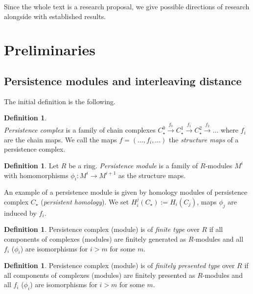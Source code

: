 \documentclass[english,12pt]{article}
\newcounter{stmcounter}[section]
\numberwithin{equation}{section}
\theoremstyle{definition}
\newtheorem{definition}[stmcounter]{Definition}
\theoremstyle{remark}
\newcommand{\define}[1]{{\textit{#1}}}
\begin{document}
Since the whole text is a research proposal, we give possible directions of research alongside with established results.

\section{Preliminaries}

\subsection{Persistence modules and interleaving distance}

The initial definition is the following.

\begin{definition} {\cite[Definition 3.1]{Zomorodian05}}\\
  \define{Persistence complex} is a family of chain complexes $C_{\star}^{0} \xrightarrow{f_0} C_{\star}^{1} \xrightarrow{f_1} C_{\star}^{2} \xrightarrow{f_2} \ldots$ where $f_i$ are the chain maps. We call the maps $f=(\ldots,f_i,\ldots)$ the \define{structure maps} of a persistence complex.
\end{definition}

\begin{definition}
  Let $R$ be a ring. \define{Persistence module} is a family of $R$-modules $M^i$ with homomorphisms $\phi_i : M^i \to M^{i+1}$ as the structure maps.
\end{definition}

An example of a persistence module is given by homology modules of persistence complex $C_{\star}$ (\define{persistent homology}). We set $H_i^j(C_{\star}) := H_i(C_{j})$, maps $\phi_j$ are induced by $f_i$.\\

\begin{definition}
  Persistence complex (module) is of \define{finite type} over $R$ if all components of complexes (modules) are finitely generated as $R$-modules and all $f_i$ ($\phi_i$) are isomorphisms for $i > m$ for some $m$.
\end{definition}

\begin{definition}
  Persistence complex (module) is of \define{finitely presented type} over $R$ if all components of complexes (modules) are finitely presented as $R$-modules and all $f_i$ ($\phi_i$) are isomorphisms for $i > m$ for some $m$.
\end{definition}
\end{document}
